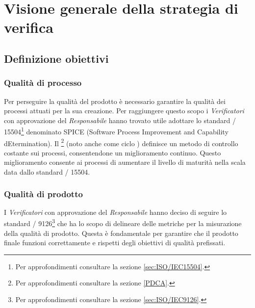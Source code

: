 \documentclass{scalatekids-article}
\begin{document}
\section{Visione generale della strategia di verifica}
\subsection{Definizione obiettivi}
\subsubsection{Qualità di processo}
Per perseguire la qualità del prodotto è necessario garantire la qualità dei processi attuati per la sua creazione. Per raggiungere questo scopo i \textit{Verificatori} con approvazione del \textit{Responsabile} hanno trovato utile adottare lo standard / 15504\footnote[1]{Per approfondimenti consultare la sezione \ref{sec:ISO/IEC15504}.} denominato SPICE (Software Process Improvement and Capability dEtermination). Il \footnote[2]{Per approfondimenti consultare la sezione \ref{PDCA}.} (noto anche come ciclo ) definisce un metodo di controllo costante sui processi, consentendone un miglioramento continuo. Questo miglioramento consente ai processi di aumentare il livello di maturità nella scala data dallo standard / 15504.
\subsubsection{Qualità di prodotto}
I \textit{Verificatori} con approvazione del \textit{Responsabile} hanno deciso di seguire lo standard / 9126\footnote[3]{Per approfondimenti consultare la sezione \ref{sec:ISO/IEC9126}.} che ha lo scopo di delineare delle metriche per la misurazione della qualità di prodotto. Questa è fondamentale per garantire che il prodotto  finale funzioni correttamente e rispetti degli obiettivi di qualità prefissati.
\end{document}
